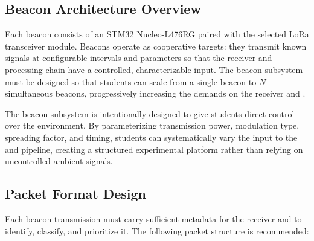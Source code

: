 \documentclass[11pt,letterpaper]{article}
\begin{document}
	\subsection{Beacon Architecture Overview}
	
	Each beacon consists of an STM32 Nucleo-L476RG paired with the selected LoRa transceiver module. Beacons operate as cooperative targets: they transmit known signals at configurable intervals and parameters so that the receiver and \FPGA{} processing chain have a controlled, characterizable input. The beacon subsystem must be designed so that students can scale from a single beacon to $N$ simultaneous beacons, progressively increasing the demands on the receiver and \FPGA{}.
	
	\begin{tcolorbox}[infobox={Design Principle: Controlled Complexity}]
		The beacon subsystem is intentionally designed to give students direct control over the \RF{} environment. By parameterizing transmission power, modulation type, spreading factor, and timing, students can systematically vary the input to the \FPGA{} and \ML{} pipeline, creating a structured experimental platform rather than relying on uncontrolled ambient signals.
	\end{tcolorbox}
	
	\subsection{Packet Format Design}
	
	Each beacon transmission must carry sufficient metadata for the receiver and \FPGA{} to identify, classify, and prioritize it. The following packet structure is recommended:
	
\end{document}

